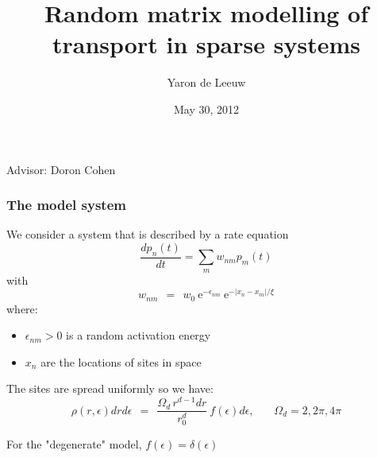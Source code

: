 \documentclass{beamer}
\newcommand{\eexp}{\mbox{e}^}
\begin{document}
\title[CM Theory Lunch]{Random matrix modelling of transport in sparse systems}  
\author{Yaron de Leeuw}
\date{May 30, 2012} 

\begin{frame}
 \titlepage
Advisor: Doron Cohen
\end{frame}



\begin{frame}
\frametitle{The model system}
We consider a system that is described by a rate equation
%
\[
\frac{dp_n(t)}{dt} = \sum_m w_{nm} p_m(t)
\]
with
\[
w_{nm} \ \ = \ \  w_0 \ \eexp{-\epsilon_{nm}} \ \eexp{-|x_n-x_m|/\xi}
\]
where:
\begin{itemize}
\item $\epsilon_{nm}>0$ is a random activation energy
\item $x_n$ are the locations of sites in space
\end{itemize}
The sites are spread uniformly so we have:
\[
\rho(r,\epsilon)drd\epsilon \ \ = \ \ \frac{\Omega_d \, r^{d-1}dr}{r_0^{d}} \ f(\epsilon)d\epsilon,     
\ \ \ \ \ \ \ \ \Omega_d=2,2\pi,4\pi
\]

For the "degenerate" model, $f(\epsilon) = \delta(\epsilon)$

\end{frame}
\end{document}
